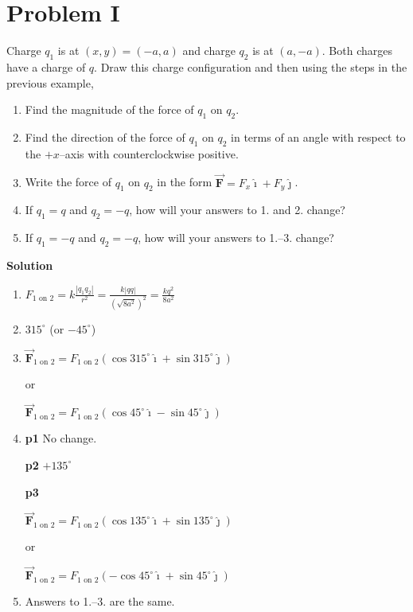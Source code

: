 \documentclass{article}
\renewcommand{\mbox}{\text}
\newcommand{\ds}[0]{\displaystyle}
\newcommand{\ihat}[0]{\hat{\boldsymbol{\imath}}}
\newcommand{\jhat}[0]{\hat{\boldsymbol{\jmath}}}
\newcommand{\bfvec}[1]{\vec{\mathbf{#1}}}
\begin{document}
\newpage

\section{Problem I}

Charge $q_1$ is at $(x,y)=(-a,a)$ and charge $q_2$ is at $(a, -a)$. Both charges have a charge of $q$. Draw this charge configuration and then using the steps in the previous example,

\begin{enumerate}

  \item Find the magnitude of the force of $q_1$ on $q_2$.

  \item Find the direction of the force of $q_1$ on $q_2$ in terms of an angle with respect to the $+x$--axis with counterclockwise positive.

  \item Write the force of $q_1$ on $q_2$ in the form $\bfvec{F}=F_x\ihat + F_y\jhat$.

  \item If $q_1=q$ and $q_2=-q$, how will your answers to 1. and 2. change?

  \item If $q_1=-q$ and $q_2=-q$, how will your answers to 1.--3. change?

\end{enumerate}

\ifsolutions
{\bf Solution}

    \begin{enumerate}

      \item $\ds F_{1\mbox{ on } 2}=k\frac{|q_1q_2|}{r^2}=\frac{k|qq|}{(\sqrt{8a^2})^2}=\frac{kq^2}{8a^2}$

      \item $315^\circ$ (or $-45^\circ$)

      \item $\bfvec{F}_{1\mbox{ on } 2} = F_{1\mbox{ on } 2}(\cos 315^\circ \ihat + \sin 315^\circ \jhat)$

            or

            $\bfvec{F}_{1\mbox{ on } 2} = F_{1\mbox{ on } 2}(\cos 45^\circ \ihat - \sin 45^\circ \jhat)$

      \item \textbf{p1} No change.

            \textbf{p2} $+135^\circ$

            \textbf{p3}

            $\bfvec{F}_{1\mbox{ on } 2} = F_{1\mbox{ on } 2}(\cos 135^\circ \ihat + \sin 135^\circ \jhat)$

            or

            $\bfvec{F}_{1\mbox{ on } 2} = F_{1\mbox{ on } 2}(-\cos 45^\circ \ihat + \sin 45^\circ \jhat)$

      \item Answers to 1.--3. are the same.

    \end{enumerate}
\else
\end{document}
